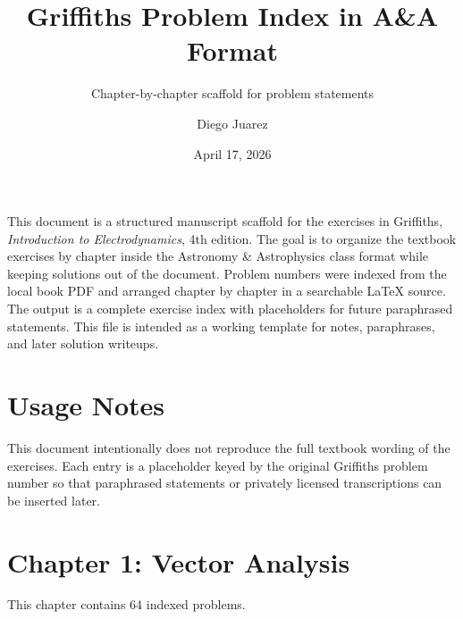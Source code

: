 \documentclass{aa}
\begin{document}
\title{Griffiths Problem Index in A\&A Format}
\subtitle{Chapter-by-chapter scaffold for problem statements}

\author{Diego Juarez}
\date{April 17, 2026}

\abstract
{This document is a structured manuscript scaffold for the exercises in Griffiths, \emph{Introduction to Electrodynamics}, 4th edition.}
{The goal is to organize the textbook exercises by chapter inside the Astronomy \& Astrophysics class format while keeping solutions out of the document.}
{Problem numbers were indexed from the local book PDF and arranged chapter by chapter in a searchable LaTeX source.}
{The output is a complete exercise index with placeholders for future paraphrased statements.}
{This file is intended as a working template for notes, paraphrases, and later solution writeups.}


\maketitle

\section{Usage Notes}
This document intentionally does not reproduce the full textbook wording of the exercises. Each entry is a placeholder keyed by the original Griffiths problem number so that paraphrased statements or privately licensed transcriptions can be inserted later.

\tableofcontents

\section{Chapter 1: Vector Analysis}
This chapter contains 64 indexed problems.
\end{document}
